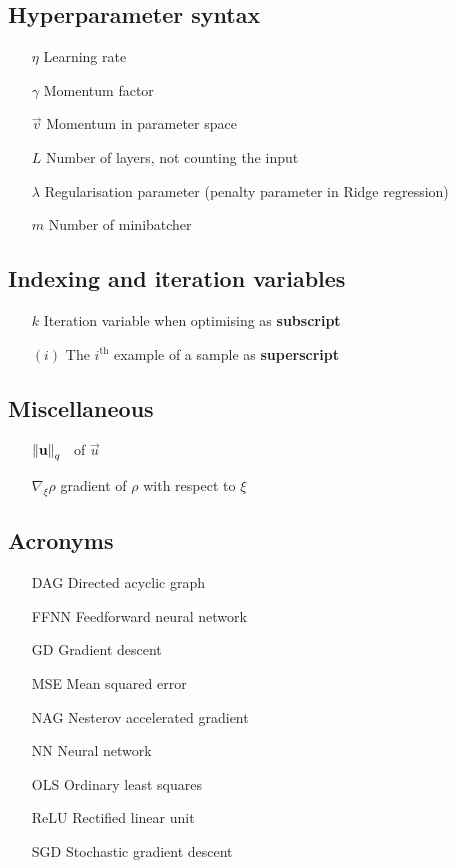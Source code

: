 \subsection{Hyperparameter syntax}
\begin{itemize}
    \item[$\eta$] Learning rate
    \item[$\gamma$] Momentum factor
    \item[$\vec{v}$] Momentum in parameter space  
    \item[$L$] Number of layers, not counting the input 
    \item[$\lambda$] Regularisation parameter (penalty parameter in Ridge regression)
    \item[$m$] Number of minibatcher
\end{itemize}


\subsection{Indexing and iteration variables}
\begin{itemize}
    \item[$k$] Iteration variable when optimising as \textbf{subscript}
    \item[$(i)$] The $i^\mathrm{th}$ example of a sample as \textbf{superscript}
\end{itemize}


\subsection{Miscellaneous}

\begin{enumerate}[leftmargin=2.1em]
    \item[$\norm{\mathbf{u}}_q$] \lnorm[q]\, of $\vec{u}$
    \item[$\nabla_{\!\xi} \rho$] gradient of $\rho$ with respect to $\xi$
\end{enumerate}

\subsection{Acronyms}
\begin{enumerate}[leftmargin=2.6em]
    \item[DAG] Directed acyclic graph
    \item[FFNN] Feedforward neural network
    \item[GD] Gradient descent
    \item[MSE] Mean squared error 
    \item[NAG] Nesterov accelerated gradient
    \item[NN] Neural network 
    \item[OLS] Ordinary least squares 
    \item[ReLU] Rectified linear unit
    \item[SGD] Stochastic gradient descent 
\end{enumerate}


